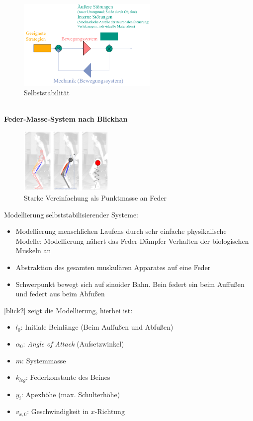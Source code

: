 \begin{figure}[h!]
	\centering
	\includegraphics[width=0.6\textwidth]{figures/ch06_selbststab.png}
	\caption{Selbststabilität}
	\label{stab}
\end{figure}\\
\bigskip
\textbf{Feder-Masse-System nach Blickhan}\\
\begin{figure}[h!]
	\centering
	\includegraphics[width=0.4\textwidth]{figures/ch06_blickhan1.png}
	\caption{Starke Vereinfachung als Punktmasse an Feder}
	\label{blick}
\end{figure}
Modellierung selbststabilisierender Systeme:  
\begin{itemize}
\item Modellierung menschlichen Laufens durch sehr einfache physikalische Modelle; Modellierung nähert das Feder-Dämpfer Verhalten
der biologischen Muskeln an
\item Abstraktion des gesamten muskulären Apparates auf eine Feder
\item Schwerpunkt bewegt sich auf sinoider Bahn. Bein \glqq federt ein\grqq{} beim Auffußen und \glqq federt aus\grqq{} beim Abfußen
\end{itemize}
\autoref{blick2} zeigt die Modellierung, hierbei ist:
\begin{itemize}
	\item $l_0$: Initiale Beinlänge (Beim Auffußen und Abfußen)
	\item $\alpha_0$: \textit{Angle of Attack} (Aufsetzwinkel)
	\item $m$: Systemmasse
	\item $k_{leg}$: Federkonstante des Beines
	\item $y_i$: Apexhöhe (max. Schulterhöhe)
	\item $v_{x,0}$: Geschwindigkeit in $x$-Richtung
	\end{itemize}
